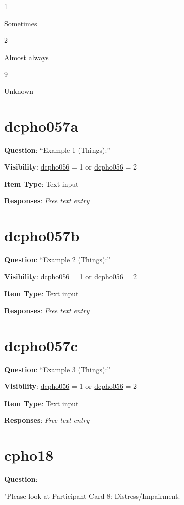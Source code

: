 \documentclass[]{book}
\begin{document}
1

Sometimes

2

Almost always

9

Unknown

\hypertarget{dcpho057a}{%
\section{dcpho057a}\label{dcpho057a}}

\textbf{Question}: ``Example 1 (Things):''

\textbf{Visibility}: \protect\hyperlink{dcpho056}{dcpho056} = 1 or \protect\hyperlink{dcpho056}{dcpho056} = 2

\textbf{Item Type}: Text input

\textbf{Responses}: \emph{Free text entry}

\hypertarget{dcpho057b}{%
\section{dcpho057b}\label{dcpho057b}}

\textbf{Question}: ``Example 2 (Things):''

\textbf{Visibility}: \protect\hyperlink{dcpho056}{dcpho056} = 1 or \protect\hyperlink{dcpho056}{dcpho056} = 2

\textbf{Item Type}: Text input

\textbf{Responses}: \emph{Free text entry}

\hypertarget{dcpho057c}{%
\section{dcpho057c}\label{dcpho057c}}

\textbf{Question}: ``Example 3 (Things):''

\textbf{Visibility}: \protect\hyperlink{dcpho056}{dcpho056} = 1 or \protect\hyperlink{dcpho056}{dcpho056} = 2

\textbf{Item Type}: Text input

\textbf{Responses}: \emph{Free text entry}

\hypertarget{cpho18}{%
\section{cpho18}\label{cpho18}}

\textbf{Question}:

"Please look at Participant Card 8: Distress/Impairment.
\end{document}
